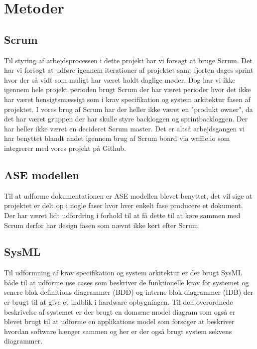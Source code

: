 \section{Metoder}
\subsection{Scrum}
Til styring af arbejdsprocessen i dette projekt har vi forsøgt at bruge Scrum. Det har vi forsøgt at udføre igennem iterationer af projektet samt fjorten dages sprint hvor der så vidt som muligt har været holdt daglige møder. Dog har vi ikke igennem hele projekt perioden brugt Scrum der har været perioder hvor det ikke har været hensigtsmæssigt som i krav specifikation og system arkitektur fasen af projektet. I vores brug af Scrum har der heller ikke været en "produkt owner", da det har været gruppen der har skulle styre backloggen og sprintbackloggen. Der har heller ikke været en decideret Scrum master. Det er altså arbejdsgangen vi har benyttet blandt andet igennem brug af Scrum board via waffle.io som integrerer med vores projekt på Github. 

\subsection{ASE modellen}
Til at udforme dokumentationen er ASE modellen blevet benyttet, det vil sige at projektet er delt op i nogle faser hvor hver enkelt fase producere et dokument. Der har været lidt udfordring i forhold til at få dette til at køre sammen med Scrum derfor har design fasen som nævnt ikke kørt efter Scrum.

\subsection{SysML}
Til udformning af krav specifikation og system arkitektur er der brugt SysML både til at udforme use cases som beskriver de funktionelle krav for systemet og senere blok definitions diagrammer (BDD) og interne blok diagrammer (IDB) der er brugt til at give et indblik i hardware opbygningen. Til den overordnede beskrivelse af systemet er der brugt en domæne model diagram som også er blevet brugt til at udforme en applikations model som forsøger at beskriver hvordan software hænger sammen og her er der også brugt system sekvens diagrammer.

